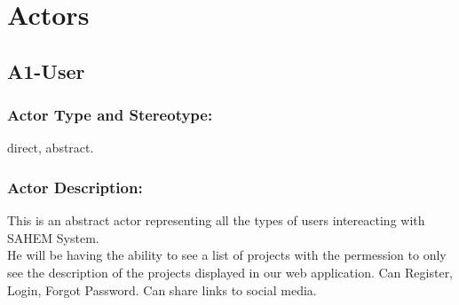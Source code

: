 \documentclass[11pt, openany]{report}
\begin{document}
\section{Actors}


\subsection{A1-User}
\label{A1}
\subsubsection{Actor Type and Stereotype:}
direct, abstract.
\subsubsection{Actor Description:}
This is an abstract actor representing all the types of users intereacting with SAHEM System.
\\He will be having the ability to see a list of projects with the permession to only see the description of the projects displayed in our web application.
Can Register, Login, Forgot Password.
Can share links to social media.
\end{document}
